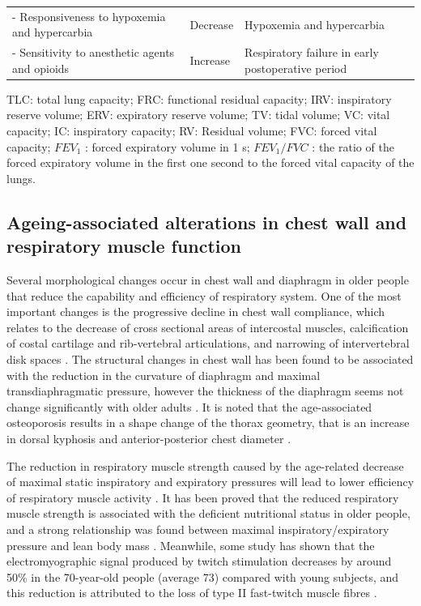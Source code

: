 \begin{table}[htbp]
\begin{tabular}{p{5.8cm} p{3.6cm} p{4.8cm}}
- Responsiveness to hypoxemia and hypercarbia & Decrease & Hypoxemia and hypercarbia\\
- Sensitivity to anesthetic agents and opioids & Increase & Respiratory failure in early postoperative period\\
\hline
\end{tabular}
\begin{tablenotes}
        \footnotesize
        \item{TLC: total lung capacity; FRC: functional residual capacity; IRV: inspiratory reserve volume; ERV: expiratory reserve volume; TV: tidal volume; VC: vital capacity; IC: inspiratory capacity; RV: Residual volume; FVC: forced vital capacity; $FEV_1$ : forced expiratory volume in 1 s; $FEV_1/FVC$ : the ratio of the forced expiratory volume in the first one second to the forced vital capacity of the lungs.}
\end{tablenotes}
\end{table}

\subsection{Ageing-associated alterations in chest wall and respiratory muscle function} \label{ChestWallChange}
Several morphological changes occur in chest wall and diaphragm in older people that reduce the capability and efficiency of respiratory system. One of the most important changes is the progressive decline in chest wall compliance, which relates to the decrease of cross sectional areas of intercostal muscles, calcification of costal cartilage and rib-vertebral articulations, and narrowing of intervertebral disk spaces \citep{murray1986normal, crapo1993aging}. The structural changes in chest wall has been found to be associated with the reduction in the curvature of diaphragm and maximal transdiaphragmatic pressure, however the thickness of the diaphragm seems not change significantly with older adults \citep{zaugg2000respiratory, sprung2006age}. It is noted that the age-associated osteoporosis results in a shape change of the thorax geometry, that is an increase in dorsal kyphosis and anterior-posterior chest diameter \citep{janssens1999physiological,sprung2006age}. 

The reduction in respiratory muscle strength caused by the age-related decrease of maximal static inspiratory and expiratory pressures will lead to lower efficiency of respiratory muscle activity \citep{wijesinghe2005effect,sprung2006age,lalley2013aging}. It has been proved that the reduced respiratory muscle strength is associated with the deficient nutritional status in older people, and a strong relationship was found between maximal inspiratory/expiratory pressure and lean body mass \citep{arora1982respiratory,janssens1999physiological}. Meanwhile, some study has shown that the electromyographic signal produced by twitch stimulation decreases by around 50\% in the 70-year-old people (average 73) compared with young subjects, and this reduction is attributed to the loss of type II fast-twitch muscle fibres \citep{larsson1983histochemical}. 


